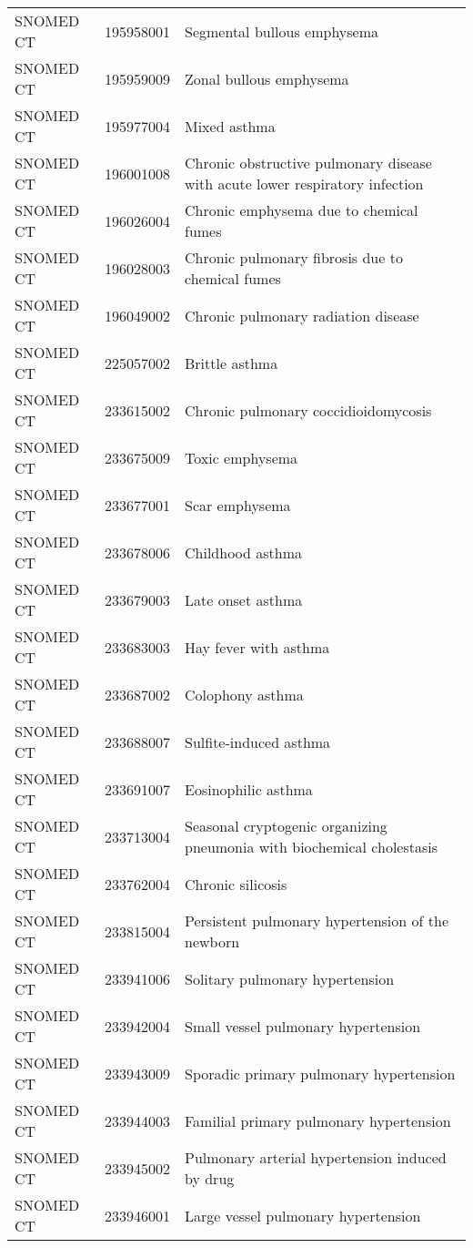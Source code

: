 \begin{table}[ht]
\begin{tabular}{lll}
  SNOMED CT & 195958001 & Segmental bullous emphysema \\ 
  SNOMED CT & 195959009 & Zonal bullous emphysema \\ 
  SNOMED CT & 195977004 & Mixed asthma \\ 
  SNOMED CT & 196001008 & Chronic obstructive pulmonary disease with acute lower respiratory infection \\ 
  SNOMED CT & 196026004 & Chronic emphysema due to chemical fumes \\ 
  SNOMED CT & 196028003 & Chronic pulmonary fibrosis due to chemical fumes \\ 
  SNOMED CT & 196049002 & Chronic pulmonary radiation disease \\ 
  SNOMED CT & 225057002 & Brittle asthma \\ 
  SNOMED CT & 233615002 & Chronic pulmonary coccidioidomycosis \\ 
  SNOMED CT & 233675009 & Toxic emphysema \\ 
  SNOMED CT & 233677001 & Scar emphysema \\ 
  SNOMED CT & 233678006 & Childhood asthma \\ 
  SNOMED CT & 233679003 & Late onset asthma \\ 
  SNOMED CT & 233683003 & Hay fever with asthma \\ 
  SNOMED CT & 233687002 & Colophony asthma \\ 
  SNOMED CT & 233688007 & Sulfite-induced asthma \\ 
  SNOMED CT & 233691007 & Eosinophilic asthma \\ 
  SNOMED CT & 233713004 & Seasonal cryptogenic organizing pneumonia with biochemical cholestasis \\ 
  SNOMED CT & 233762004 & Chronic silicosis \\ 
  SNOMED CT & 233815004 & Persistent pulmonary hypertension of the newborn \\ 
  SNOMED CT & 233941006 & Solitary pulmonary hypertension \\ 
  SNOMED CT & 233942004 & Small vessel pulmonary hypertension \\ 
  SNOMED CT & 233943009 & Sporadic primary pulmonary hypertension \\ 
  SNOMED CT & 233944003 & Familial primary pulmonary hypertension \\ 
  SNOMED CT & 233945002 & Pulmonary arterial hypertension induced by drug \\ 
  SNOMED CT & 233946001 & Large vessel pulmonary hypertension \\ 

\end{tabular}
\end{table}
